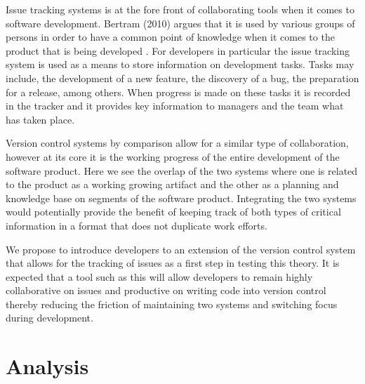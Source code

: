 \documentclass{mproj}
\begin{document}
Issue tracking systems is at the fore front of collaborating tools when it comes to software development. Bertram (2010) argues that it is used by various groups of persons in order to have a common point of knowledge when it comes to the product that is being developed \cite{Bertram:2010}. For developers in particular the issue tracking system is used as a means to store information on development tasks. Tasks may include, the development of a new feature, the discovery of a bug, the preparation for a release, among others. When progress is made on these tasks it is recorded in the tracker and it provides key information to managers and the team what has taken place.

Version control systems by comparison allow for a similar type of collaboration, however at its core it is the working progress of the entire development of the software product. Here we see the overlap of the two systems where one is related to the product as a working growing artifact and the other as a planning and knowledge base on segments of the software product. Integrating the two systems would potentially provide the benefit of keeping track of both types of critical information in a format that does not duplicate work efforts.

We propose to introduce developers to an extension of the version control system that allows for the tracking of issues as a first step in testing this theory. It is expected that a tool such as this will allow developers to remain highly collaborative on issues and productive on writing code into version control thereby reducing the friction of maintaining two systems and switching focus during development.

\chapter{Analysis}\label{analysis}





\end{document}
